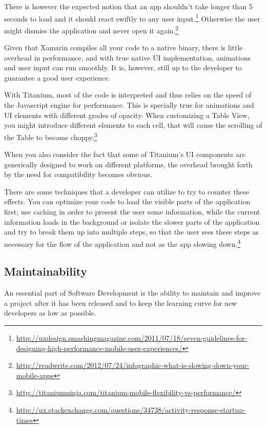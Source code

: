 There is however the expected notion that an app shouldn't take longer than 5 seconds to load and it should react swiftly to any user input.\footnote{\url{http://uxdesign.smashingmagazine.com/2011/07/18/seven-guidelines-for-designing-high-performance-mobile-user-experiences/}} Otherwise the user might dismiss the application and never open it again.\footnote{\url{http://readwrite.com/2012/07/24/infographic-what-is-slowing-down-your-mobile-apps}}

Given that Xamarin compiles all your code to a native binary, there is little overhead in performance, and with true native \ac{UI} implementation, animations and user input can run smoothly. It is, however, still up to the developer to guarantee a good user experience. 

With Titanium, most of the code is interpreted and thus relies on the speed of the Javascript engine for performance. This is specially true for animations and \ac{UI} elements with different grades of opacity. When customizing a Table View, you might introduce different elements to each cell, that will cause the scrolling of the Table to become choppy.\footnote{\url{http://titaniumninja.com/titanium-mobile-flexibility-vs-performance/}}

When you also consider the fact that some of Titanium's \ac{UI} components are generically designed to work on different platforms, the overhead brought forth by the need for compatibility becomes obvious.

There are some techniques that a developer can utilize to try to counter these effects. You can optimize your code to load the visible parts of the application first; use caching in order to present the user some information, while the current information loads in the background or isolate the slower parts of the application and try to break them up into multiple steps, so that the user sees these steps as necessary for the flow of the application and not as the app slowing down.\footnote{\url{http://ux.stackexchange.com/questions/34738/activity-response-startup-times}}  

   
\subsection{Maintainability}
An essential part of Software Development is the ability to maintain and improve a project after it has been released and to keep the learning curve for new developers as low as possible. 

